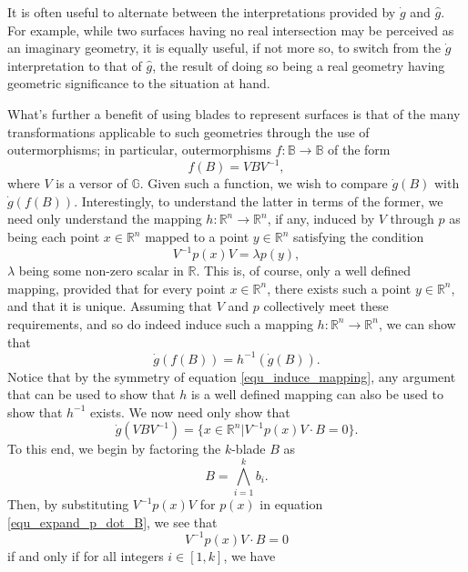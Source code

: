 \documentclass{ecgd-l}
\numberwithin{equation}{section}
\newcommand{\R}{\mathbb{R}}
\newcommand{\B}{\mathbb{B}}
\newcommand{\G}{\mathbb{G}}
\newcommand{\gd}{\dot{g}}
\newcommand{\gh}{\hat{g}}
\begin{document}
It is often useful to alternate between the interpretations provided by $\gd$ and $\gh$.
For example, while two surfaces having no real intersection may be perceived as an imaginary
geometry, it is equally useful, if not more so, to switch from the $\gd$ interpretation to that of $\gh$,
the result of doing so being a real geometry having geometric significance to the situation at hand.

What's further a benefit of using blades to represent surfaces is that of the many transformations
applicable to such geometries through the use of outermorphisms; in particular,
outermorphisms $f:\B\to\B$ of the form
\begin{equation*}
f(B) = VBV^{-1},
\end{equation*}
where $V$ is a versor of $\G$.  Given such a function, we wish to
compare $\gd(B)$ with $\gd(f(B))$.  Interestingly, to understand
the latter in terms of the former, we need only understand the mapping $h:\R^n\to\R^n$,
if any, induced by $V$ through $p$ as being each point $x\in\R^n$ mapped to a point
$y\in\R^n$ satisfying the condition
\begin{equation}\label{equ_induce_mapping}
V^{-1}p(x)V=\lambda p(y),
\end{equation}
$\lambda$ being some non-zero scalar in $\R$.
This is, of course, only a well defined mapping, provided that for every point $x\in\R^n$, there exists
such a point $y\in\R^n$, and that it is unique.
Assuming that $V$ and $p$ collectively meet these requirements, and so do indeed induce
such a mapping $h:\R^n\to\R^n$, we can show that
\begin{equation*}
\gd(f(B)) = h^{-1}(\gd(B)).
\end{equation*}
Notice that by the symmetry
of equation \eqref{equ_induce_mapping}, any argument that can be
used to show that $h$ is a well defined
mapping can also be used to show that $h^{-1}$ exists.
We now need only show that
\begin{equation*}
\gd(VBV^{-1})=\{x\in\R^n|V^{-1}p(x)V\cdot B=0\}.
\end{equation*}
To this end, we begin by factoring the $k$-blade $B$ as
\begin{equation*}
B = \bigwedge_{i=1}^k b_i.
\end{equation*}
Then, by substituting $V^{-1}p(x)V$ for $p(x)$ in equation \eqref{equ_expand_p_dot_B},
we see that
\begin{equation*}
V^{-1}p(x)V\cdot B=0
\end{equation*}
if and only if for all integers $i\in[1,k]$, we have
\end{document}
